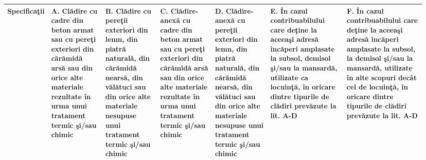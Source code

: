 \documentclass[8pt,a4paper,landscape]{extarticle}
\renewcommand{\arraystretch}{1.0}
\begin{document}
\renewcommand{\arraystretch}{1.05}
\begin{tabularx}{\textwidth}{|m{2.6cm}|X|X|X|X|X|X|}
\hline
\textbf{Specificaţii} & \textbf{A.} Clădire cu cadre din beton armat sau cu pereţi exteriori din cărămidă arsă sau din orice alte materiale rezultate în urma unui tratament termic şi/sau chimic & \textbf{B.} Clădire cu pereţii exteriori din lemn, din piatră naturală, din cărămidă nearsă, din vălătuci sau din orice alte materiale nesupuse unui tratament termic şi/sau chimic & \textbf{C.} Clădire-anexă cu cadre din beton armat sau cu pereţi exteriori din cărămidă arsă sau din orice alte materiale rezultate în urma unui tratament termic şi/sau chimic & \textbf{D.} Clădire-anexă cu pereţii exteriori din lemn, din piatră naturală, din cărămidă nearsă, din vălătuci sau din orice alte materiale nesupuse unui tratament termic şi/sau chimic & \textbf{E.} În cazul contribuabilului care deţine la aceeaşi adresă încăperi amplasate la subsol, demisol şi/sau la mansardă, utilizate ca locuinţă, în oricare dintre tipurile de clădiri prevăzute la lit. A-D & \textbf{F.} În cazul contribuabilului care deţine la aceeaşi adresă încăperi amplasate la subsol, la demisol şi/sau la mansardă, utilizate în alte scopuri decât cel de locuinţă, în oricare dintre tipurile de clădiri prevăzute la lit. A-D \\
\hline

\end{tabularx}
\end{document}
